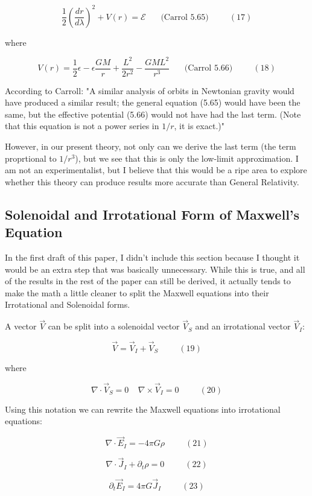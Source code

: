 \documentclass {article}
\begin{document}
$$\frac 1 2 \left( \frac {dr}{d\lambda} \right)^2 + V(r) = \mathcal{E} ~~~~~~~~ \textrm{(Carrol 5.65)} ~~~~~~~~~~~ (17)$$

where

$$V(r) = \frac 1 2 \epsilon - \epsilon \frac {GM} r + \frac {L^2}{2r^2} - \frac {GML^2}{r^3} ~~~~~~~~ \textrm{(Carrol 5.66)} ~~~~~~~~~~~ (18)$$

According to Carroll: "A similar analysis of orbits in Newtonian gravity would have produced a similar result; the general equation (5.65) would have been the same, but the effective potential (5.66) would not have had the last term. (Note that this equation is not a power series in $1/r$, it is exact.)"

However, in our present theory, not only can we derive the last term (the term proprtional to $1/r^3$), but we see that this is only the low-limit approximation. I am not an experimentalist, but I believe that this would be a ripe area to explore whether this theory can produce results more accurate than General Relativity.


\subsection{Solenoidal and Irrotational Form of Maxwell's Equation}

In the first draft of this paper, I didn't include this section because I thought it would be an extra step that was basically unnecessary. While this is true, and all of the results in the rest of the paper can still be derived, it actually tends to make the math a little cleaner to split the Maxwell equations into their Irrotational and Solenoidal forms.

A vector $\vec V$ can be split into a solenoidal vector $\vec V_S$ and an irrotational vector $\vec V_I$:

$$\vec V = \vec V_I + \vec V_S ~~~~~~~~~~~ (19)$$

where

$$\nabla \cdot \vec V_S = 0 ~~~~~ \nabla \times \vec V_I = 0 ~~~~~~~~~~~ (20)$$

Using this notation we can rewrite the Maxwell equations into irrotational equations:

$$\nabla \cdot \vec E_I = -4 \pi G  \rho ~~~~~~~~~~~ (21)$$

$$\nabla \cdot \vec J_I + \partial_t \rho = 0 ~~~~~~~~~~~ (22)$$

$$ \partial_t \vec E_I = 4 \pi G \vec J_I ~~~~~~~~~~~ (23)$$
\end{document}
